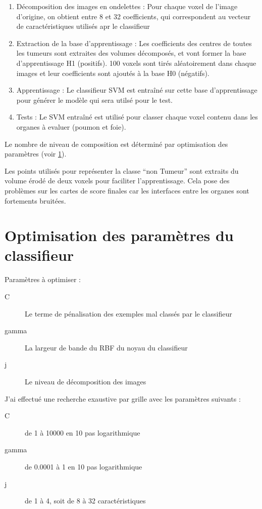\begin{enumerate}
 \item Décomposition des images en ondelettes : Pour chaque voxel de l'image d'origine, on obtient entre 8 et 32 coefficients, qui correspondent au vecteur de caractéristiques utilisés apr le classifieur
 \item Extraction de la base d'apprentissage : Les coefficients des centres de toutes les tumeurs sont extraites des volumes décomposés, et vont former la base d'apprentissage H1 (positifs). 100 voxels sont tirés aléatoirement dans chaque images et leur coefficients sont ajoutés à la base H0 (négatifs).
 \item Apprentissage : Le classifieur SVM est entraîné sur cette base d'apprentissage pour générer le modèle qui sera utilsé pour le test.
 \item Tests : Le SVM entraîné est utilisé pour classer chaque voxel contenu dans les organes à evaluer (poumon et foie).
\end{enumerate}

Le nombre de niveau de composition est déterminé par optimisation des paramètres (voir \ref{lab:optim}).

Les points utilisés pour représenter la classe ``non Tumeur'' sont extraits du volume érodé de deux voxels pour faciliter l'apprentissage. Cela pose des problèmes sur les cartes de score finales car les interfaces entre les organes sont fortements bruitées.


\section{Optimisation des paramètres du classifieur}
\label{lab:optim}

Paramètres à  optimiser :

\begin{description}
 \item[C] Le terme de pénalisation des exemples mal classés par le classifieur
 \item[gamma] La largeur de bande du RBF du noyau du classifieur
 \item[j] Le niveau de décomposition des images 
\end{description}

J'ai effectué une recherche exaustive par grille avec les paramètres suivants :

\begin{description}
 \item [C] de 1 à 10000 en 10 pas logarithmique
 \item [gamma] de 0.0001 à 1 en 10 pas logarithmique
 \item [j] de 1 à 4, soit de 8 à 32 caractéristiques
\end{description}

